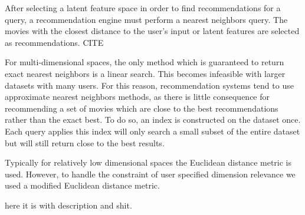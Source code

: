 After selecting a latent feature space in order to find recommendations for a query, a recommendation engine must perform a nearest neighbors query.  The movies with the closest distance to the user's input or latent features are selected as recommendations. CITE

For multi-dimensional spaces, the only method which is guaranteed to return exact nearest neighbors is a linear search.  This becomes infeasible with larger datasets with many users.  For this reason, recommendation systems tend to use approximate nearest neighbors methods, as there is little consequence for recommending a set of movies which are close to the best recommendations rather than the exact best.  To do so, an index is constructed on the dataset once.  Each query applies this index will only search a small subset of the entire dataset but will still return close to the best results.

Typically for relatively low dimensional spaces the Euclidean distance metric is used.  However, to handle the constraint of user specified dimension relevance we used a modified Euclidean distance metric.

here it is with description and shit.

